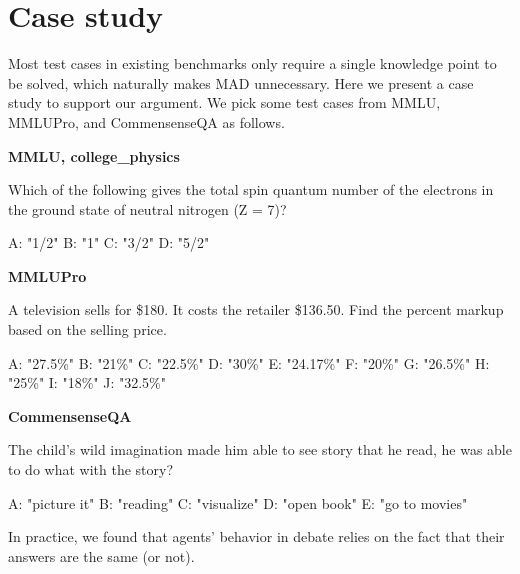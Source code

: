 \appendix
\onecolumn


\section{Case study} \label{appendix:case}
 Most test cases in existing benchmarks only require a single knowledge point to be solved, which naturally makes MAD unnecessary. Here we present a case study to support our argument. We pick some test cases from MMLU, MMLUPro, and CommensenseQA as follows.

\begin{tcolorbox}[colback=gray!10!white, colframe=black!70!white, breakable]
\textbf{MMLU, college\_physics}

Which of the following gives the total spin quantum number of the electrons in the ground state of neutral nitrogen (Z = 7)?

A: "1/2"
B: "1"
C: "3/2"
D: "5/2" 

\textbf{MMLUPro}	

A television sells for \$180. It costs the retailer \$136.50. Find the percent markup based on the selling price.

A: "27.5\%"
B: "21\%"
C: "22.5\%"
D: "30\%"
E: "24.17\%"
F: "20\%"
G: "26.5\%"
H: "25\%"
I: "18\%"
J: "32.5\%"

\textbf{CommensenseQA}

The child's wild imagination made him able to see story that he read, he was able to do what with the story?

A: "picture it"
B: "reading"
C: "visualize"
D: "open book"
E: "go to movies"


\end{tcolorbox}

 In practice, we found that agents' behavior in debate relies on the fact that their answers are the same (or not). 

